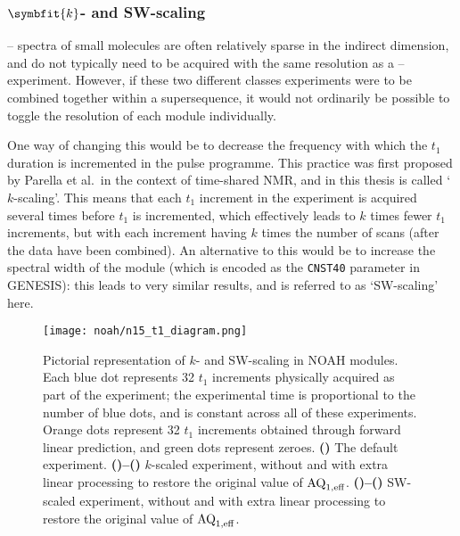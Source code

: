 \subsubsection{$\symbfit{k}$- and SW-scaling}

\proton{}--\nitrogen{} spectra of small molecules are often relatively sparse in the indirect dimension, and do not typically need to be acquired with the same resolution as a \proton{}--\carbon{} experiment.
However, if these two different classes experiments were to be combined together within a supersequence, it would not ordinarily be possible to toggle the resolution of each module individually.

One way of changing this would be to decrease the frequency with which the \nitrogen{} $t_1$ duration is incremented in the pulse programme.
This practice was first proposed by Parella et al.\ in the context of time-shared NMR\autocite{PerezTrujillo2007MRC,Parella2010CMR}, and in this thesis is called `$k$-scaling'.
This means that each $t_1$ increment in the \nitrogen{} experiment is acquired several times before $t_1$ is incremented, which effectively leads to $k$ times fewer $t_1$ increments, but with each increment having $k$ times the number of scans (after the data have been combined).
An alternative to this would be to increase the spectral width of the \nitrogen{} module (which is encoded as the \texttt{CNST40} parameter in GENESIS): this leads to very similar results, and is referred to as `SW-scaling' here.

\begin{figure}[!ht]
    \centering
    \texttt{[image: noah/n15\_t1\_diagram.png]}%
    {\label{fig:n15_t1_normal}}%
    {\label{fig:n15_t1_k}}%
    {\label{fig:n15_t1_k_lp}}%
    {\label{fig:n15_t1_sw}}%
    {\label{fig:n15_t1_sw_lp}}%
    \caption[Pictorial representation of $k$- and SW-scaling in NOAH \nitrogen{} modules]{
        Pictorial representation of $k$- and SW-scaling in NOAH \nitrogen{} modules.
        Each blue dot represents 32 $t_1$ increments physically acquired as part of the experiment; the experimental time is proportional to the number of blue dots, and is constant across all of these experiments.
        Orange dots represent 32 $t_1$ increments obtained through forward linear prediction, and green dots represent zeroes.
        \textbf{()} The default experiment.
        \textbf{()--()} $k$-scaled experiment, without and with extra linear processing to restore the original value of $\text{AQ}_{1,\text{eff}}$.
        \textbf{()--()} SW-scaled experiment, without and with extra linear processing to restore the original value of $\text{AQ}_{1,\text{eff}}$.
    }
    \label{fig:n15_t1}
\end{figure}


